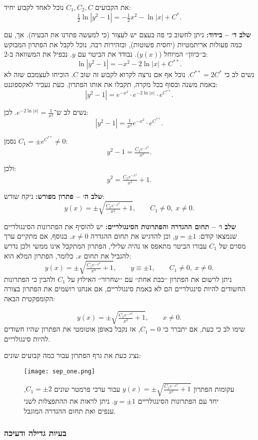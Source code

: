 \documentclass{article}
\numberwithin{equation}{section}
\begin{document}
את הקבועים $C_{1},C_{2},C$ נוכל לאחד לקבוע יחיד:
\[
\tfrac{1}{2}\ln|y^2-1| = -\tfrac{1}{2}x^2 - \ln|x| + C^*.
\]

\textbf{שלב ד׳ – בידוד:}  
ניתן לחשוב כי פה בעצם יש לעצור (כי למעשה פתרנו את הבעיה). אך, עם כמה פעולות אריתמטיות (יחסית פשוטות), ובזהירות רבה, נוכל לקבל את הפתרון המבוקש ב׳׳כיוון׳׳ המיוחל ($y(x)$).
נבודד את הביטוי עם $y$. נכפיל את המשוואה ב-2:
\[
\ln|y^2-1| = -x^2 - 2\ln|x| + C^{**}.
\]
נשים לב כי $C^{**}=2C^{*}$. נוכל אף אם נרצה לקרוא לקבוע זה שוב $C$. הוכיחו לעצמכם שזה לא באמת משנה ובסוף בכל מקרה, תקבלו את אותו הפתרון.
כעת נעביר לאקספוננט:
\[
|y^2-1| = e^{-x^2}\cdot e^{-2\ln|x|}\cdot e^{C^{**}}.
\]

נשים לב ש־$e^{-2\ln|x|} = \tfrac{1}{x^2}$. לכן:
\[
|y^2-1| = \tfrac{1}{x^2} e^{-x^2}\cdot e^{C^{**}}.
\]

נסמן $C_1 = \pm e^{C^{**}} \neq 0$:
\[
y^2-1 = \tfrac{C_1 e^{-x^2}}{x^2}.
\]

ולכן:
\[
y^2 = \tfrac{C_1 e^{-x^2}}{x^2} + 1.
\]

\textbf{שלב ה׳ – פתרון מפורש:}  
ניקח שורש:
\[
\boxed{\, y(x) = \pm \sqrt{\tfrac{C_1 e^{-x^2}}{x^2}+1}, \qquad C_1 \neq 0,\; x \neq 0. \,}
\]

\textbf{שלב ו׳ – תחום ההגדרה והפתרונות הסינגולריים:}  
יש להוסיף את הפתרונות הסינגולריים שנמצאו קודם: $y=\pm 1$, וכן להדגיש את תחום ההגדרה $x\neq 0$.  
בנוסף, אם מתקיים ערך מסוים של $C_1$ עבורו הביטוי מתאפס או נהיה שלילי, הפתרון המתקבל אינו ממשי ולכן נדרש להגביל את תחום $x$. כלומר, הפתרון המלא הוא:
\[
\boxed{\, y(x) = \pm \sqrt{\tfrac{C_1 e^{-x^2}}{x^2}+1}, \qquad y\equiv\pm1, \qquad C_1 \neq 0,\; x \neq 0. \,}
\]
ניתן לרשום את הפתרון ׳׳בבת אחת׳׳ עם ׳׳שחרור׳׳ האילוץ על $C_1$ ולהבין כי הפתרונות החשודים להיות סינגולריים הם לא באמת סינגולריים, אם אנחנו רושמים את הפתרון בצורה הקומפקטית הבאה:

\[
\boxed{\, y(x) = \pm \sqrt{\tfrac{C_1 e^{-x^2}}{x^2}+1},\qquad x \neq 0. \,}
\]
שימו לב כי כעת, אם יתברר כי $C_1=0$, אז נקבל באופן אוטומטי את הפתרון שהיו חשודים להיות סינגולריים.

נציג כעת את גרף הפתרון עבור כמה קבועים שונים:
\begin{figure}[H]
    \centering
    \texttt{[image: sep\_one.png]}
    \caption{עקומות הפתרון $y(x)=\pm \sqrt{\frac{C_1 e^{-x^2}}{x^2}+1}$ עבור ערכי פרמטר שונים $C_1=\pm 2$, 
    יחד עם הפתרונות הסינגולריים $y=\pm 1$. ניתן לראות את ההתפצלות לשני ענפים ואת תחום ההגדרה המוגבל.}
    \label{fig:sep_one}
\end{figure}

\subsubsection{בעיות גדילה ודעיכה}
\end{document}
